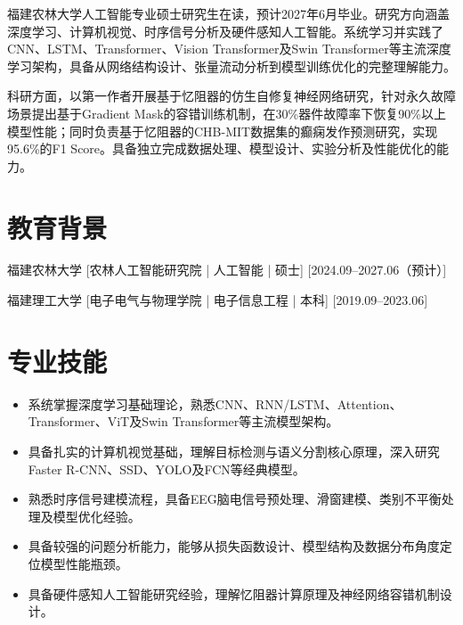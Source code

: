 \documentclass{resume-photo}
\begin{document}

\ResumeTitle

\noindent 福建农林大学人工智能专业硕士研究生在读，预计2027年6月毕业。研究方向涵盖深度学习、计算机视觉、时序信号分析及硬件感知人工智能。系统学习并实践了CNN、LSTM、Transformer、Vision Transformer及Swin Transformer等主流深度学习架构，具备从网络结构设计、张量流动分析到模型训练优化的完整理解能力。

\vspace{0.5em}
\noindent 科研方面，以第一作者开展基于忆阻器的仿生自修复神经网络研究，针对永久故障场景提出基于Gradient Mask的容错训练机制，在30\%器件故障率下恢复90\%以上模型性能；同时负责基于忆阻器的CHB-MIT数据集的癫痫发作预测研究，实现95.6\%的F1 Score。具备独立完成数据处理、模型设计、实验分析及性能优化的能力。


\section{教育背景}
\ResumeItem
{福建农林大学}
[\textnormal{农林人工智能研究院 | 人工智能 | 硕士}]
[2024.09--2027.06（预计）]

\ResumeItem
{福建理工大学}
[\textnormal{电子电气与物理学院 | 电子信息工程 | 本科}]
[2019.09--2023.06]


\section{专业技能}
\begin{itemize}
  \item 系统掌握深度学习基础理论，熟悉CNN、RNN/LSTM、Attention、Transformer、ViT及Swin Transformer等主流模型架构。
  \item 具备扎实的计算机视觉基础，理解目标检测与语义分割核心原理，深入研究Faster R-CNN、SSD、YOLO及FCN等经典模型。
  \item 熟悉时序信号建模流程，具备EEG脑电信号预处理、滑窗建模、类别不平衡处理及模型优化经验。
  \item 具备较强的问题分析能力，能够从损失函数设计、模型结构及数据分布角度定位模型性能瓶颈。
  \item 具备硬件感知人工智能研究经验，理解忆阻器计算原理及神经网络容错机制设计。
\end{itemize}
\end{document}
